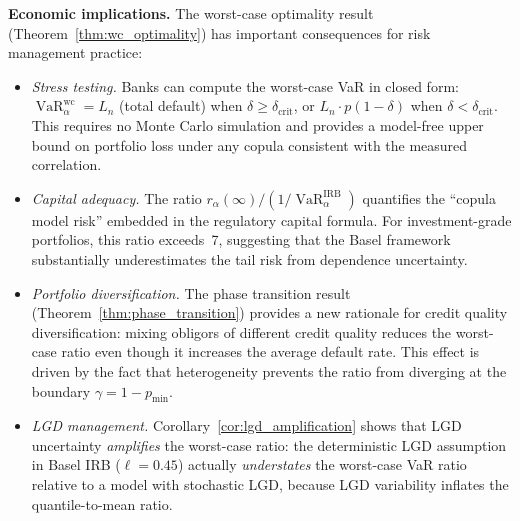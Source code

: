 \documentclass[11pt]{article}
\theoremstyle{definition}
\newcommand{\VaR}{\operatorname{VaR}}
\newcommand{\1}{\mathbf{1}}
\begin{document}
\medskip

\noindent\textbf{Economic implications.} The worst-case optimality result (Theorem~\ref{thm:wc_optimality}) has important consequences for risk management practice:

\begin{itemize}
  \item \emph{Stress testing.} Banks can compute the worst-case VaR in closed form: $\VaR_\alpha^{\mathrm{wc}} = L_n$ (total default) when $\delta \geq \delta_{\mathrm{crit}}$, or $L_n \cdot p(1-\delta)$ when $\delta < \delta_{\mathrm{crit}}$. This requires no Monte Carlo simulation and provides a model-free upper bound on portfolio loss under any copula consistent with the measured correlation.

  \item \emph{Capital adequacy.} The ratio $r_\alpha(\infty) / (1/\VaR_\alpha^{\mathrm{IRB}})$ quantifies the ``copula model risk'' embedded in the regulatory capital formula. For investment-grade portfolios, this ratio exceeds~7, suggesting that the Basel framework substantially underestimates the tail risk from dependence uncertainty.

  \item \emph{Portfolio diversification.} The phase transition result (Theorem~\ref{thm:phase_transition}) provides a new rationale for credit quality diversification: mixing obligors of different credit quality reduces the worst-case ratio even though it increases the average default rate. This effect is driven by the fact that heterogeneity prevents the ratio from diverging at the boundary $\gamma = 1 - p_{\min}$.

  \item \emph{LGD management.} Corollary~\ref{cor:lgd_amplification} shows that LGD uncertainty \emph{amplifies} the worst-case ratio: the deterministic LGD assumption in Basel IRB ($\ell = 0.45$) actually \emph{understates} the worst-case VaR ratio relative to a model with stochastic LGD, because LGD variability inflates the quantile-to-mean ratio.
\end{itemize}

\medskip
\end{document}
